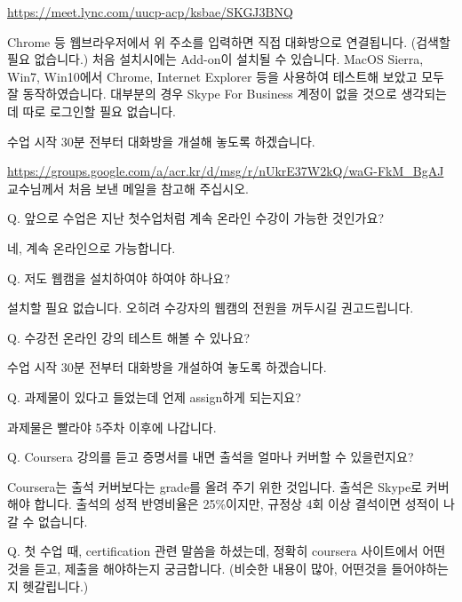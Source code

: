\documentclass[12pt,]{krantz}
\renewenvironment{quote}{\begin{VF}}{\end{VF}}
\begin{document}
\url{https://meet.lync.com/uucp-acp/ksbae/SKGJ3BNQ}

Chrome 등 웹브라우저에서 위 주소를 입력하면 직접 대화방으로 연결됩니다.
(검색할 필요 없습니다.) 처음 설치시에는 Add-on이 설치될 수 있습니다.
MacOS Sierra, Win7, Win10에서 Chrome, Internet Explorer 등을 사용하여
테스트해 보았고 모두 잘 동작하였습니다. 대부분의 경우 Skype For Business
계정이 없을 것으로 생각되는데 따로 로그인할 필요 없습니다.

수업 시작 30분 전부터 대화방을 개설해 놓도록 하겠습니다.

\url{https://groups.google.com/a/acr.kr/d/msg/r/nUkrE37W2kQ/waG-FkM_BgAJ}
교수님께서 처음 보낸 메일을 참고해 주십시오.

\begin{quote}
Q. 앞으로 수업은 지난 첫수업처럼 계속 온라인 수강이 가능한 것인가요?
\end{quote}

네, 계속 온라인으로 가능합니다.

\begin{quote}
Q. 저도 웹캠을 설치하여야 하여야 하나요?
\end{quote}

설치할 필요 없습니다. 오히려 수강자의 웹캠의 전원을 꺼두시길
권고드립니다.

\begin{quote}
Q. 수강전 온라인 강의 테스트 해볼 수 있나요?
\end{quote}

수업 시작 30분 전부터 대화방을 개설하여 놓도록 하겠습니다.

\begin{quote}
Q. 과제물이 있다고 들었는데 언제 assign하게 되는지요?
\end{quote}

과제물은 빨라야 5주차 이후에 나갑니다.

\begin{quote}
Q. Coursera 강의를 듣고 증명서를 내면 출석을 얼마나 커버할 수
있을런지요?
\end{quote}

Coursera는 출석 커버보다는 grade를 올려 주기 위한 것입니다. 출석은
Skype로 커버해야 합니다. 출석의 성적 반영비율은 25\%이지만, 규정상 4회
이상 결석이면 성적이 나갈 수 없습니다.

\begin{quote}
Q. 첫 수업 때, certification 관련 말씀을 하셨는데, 정확히 coursera
사이트에서 어떤 것을 듣고, 제출을 해야하는지 궁금합니다. (비슷한 내용이
많아, 어떤것을 들어야하는지 헷갈립니다.)
\end{quote}
\end{document}
